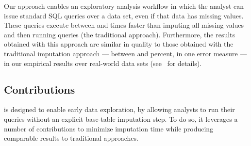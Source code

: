 

Our approach enables an exploratory analysis workflow in which the analyst can issue
standard SQL queries over a data set, even if that data has missing values.
These queries execute between \lowxalphazero{} and \highxalphazero{} times faster than
imputing all missing values and then running queries (the traditional approach). Furthermore, the results obtained with this approach
are similar in quality to those obtained with the traditional imputation approach
--- between \lowsmapealphazero{} and \highsmapealphaone{}
percent, in one error measure --- in our empirical results over real-world data sets (see~
for details).


\subsection{Contributions}
\ProjectName{} is designed to enable early data exploration, by allowing analysts to run
their queries without an explicit base-table imputation step. To do so, it leverages a number of contributions
to minimize imputation time while producing comparable results to traditional approaches.

